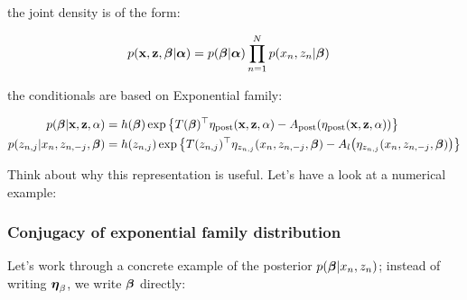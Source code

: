\documentclass{article}
\def\post{\text{post}}
\begin{document}
the joint density is of the form:

\begin{equation}\begin{split}
p( {\mathbf x}, {\mathbf z}, \boldsymbol{\beta} | \boldsymbol{\alpha}) &= p(\boldsymbol{\beta}|\boldsymbol{\alpha}) \prod_{n=1}^N p (x_n, z_n | \boldsymbol{\beta})
\end{split}\end{equation}



the conditionals are based on Exponential family:

\begin{equation}\begin{split}
p(\bbeta | \x, \z, \alpha) &= h(\bbeta) \exp \left\{  T(\bbeta)^\top \eta_\post( \x, \z, \alpha) - A_\post( \eta_\post ( \x, \z, \alpha) ) \right\}\\
p(z_{n,j} | x_{n}, z_{n,-j},\bbeta ) &= h(z_{n,j}) \exp\left\{ T (z_{n,j})^\top \eta_{z_{n,j}}(x_n, z_{n,-j},\bbeta)  - A_l \big(\eta_{z_{n,j}}(x_n, z_{n,-j},\bbeta)\big) \right\}\\
\end{split}\end{equation}


Think about why this representation is useful. Let's have a look at a numerical example:











\subsubsection{Conjugacy of exponential family distribution}

Let's work through a concrete example of the posterior $p (\boldsymbol{\beta} | x_n, z_n)$; instead of writing $\boldsymbol{\eta}_\beta$, we write $\boldsymbol{\beta}$ directly:
\end{document}
